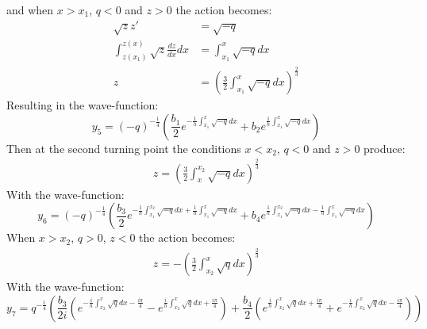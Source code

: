 		and when $x>x_{1}$, $q<0$ and $z>0$ the action becomes:
		\begin{align}
			\sqrt{z}z'&=\sqrt{-q}\\
			\int_{z\left(x_{1}\right)}^{z\left(x\right)}\sqrt{z}\frac{dz}{dx}dx&=\int_{x_{1}}^{x}\sqrt{-q}dx\\
			z&=\left(\frac{3}{2}\int_{x_{1}}^{x}\sqrt{-q}dx\right)^{\frac{2}{3}}
		\end{align}
		Resulting in the wave-function:
		\begin{equation}
			y_{5}=\left(-q\right)^{-\frac{1}{4}}\left(\frac{b_{1}}{2}e^{-\frac{1}{h}\int_{x_{1}}^{x}\sqrt{-q}dx}+b_{2}e^{\frac{1}{h}\int_{x_{1}}^{x}\sqrt{-q}dx}\right)
		\end{equation}
		Then at the second turning point the conditions $x<x_{2}$, $q<0$ and $z>0$ produce:
		\begin{align}
			z=\left(\frac{3}{2}\int_{x}^{x_{2}} \sqrt{-q} dx\right)^{\frac{2}{3}}
		\end{align}
		With the wave-function:
		\begin{equation}
			y_{6}=\left(-q\right)^{-\frac{1}{4}}\left(\frac{b_{3}}{2}e^{-\frac{1}{h}\int_{x_{1}}^{x_{2}}\sqrt{-q}dx+\frac{1}{h}\int_{x_{1}}^{x}\sqrt{-q}dx}+b_{4}e^{\frac{1}{h}\int_{x_{1}}^{x_{2}}\sqrt{-q}dx-\frac{1}{h}\int_{x_{1}}^{x}\sqrt{-q}dx}\right)
		\end{equation}
		When $x>x_{2}$, $q>0$, $z<0$ the action becomes:
		\begin{align}
			z=-\left(\frac{3}{2}\int_{x_{2}}^{x}\sqrt{q}dx\right)^{\frac{2}{3}}
		\end{align}
		With the wave-function:
		\begin{equation}
			y_{7}=q^{-\frac{1}{4}}\left(\frac{b_{3}}{2i}\left(e^{-\frac{i}{h}\int_{x_{2}}^{x}\sqrt{q}dx-\frac{i\pi}{4}}-e^{\frac{i}{h}\int_{x_{2}}^{x}\sqrt{q}dx+\frac{i\pi}{4}}\right)+\frac{b_{4}}{2}\left(e^{\frac{i}{h}\int_{x_{2}}^{x}\sqrt{q}dx+\frac{i\pi}{4}}+e^{-\frac{i}{h}\int_{x_{2}}^{x}\sqrt{q}dx-\frac{i\pi}{4}}\right)\right)
		\end{equation}
